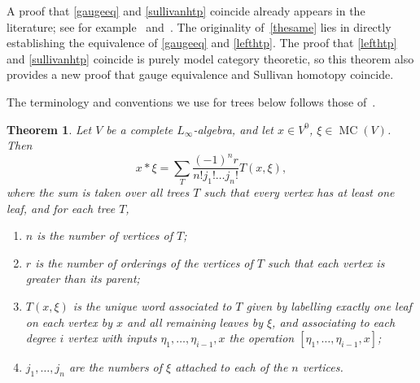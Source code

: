 \documentclass[a4paper,reqno]{amsart}
\theoremstyle{plain}
\newtheorem{thm}{Theorem}[section]
\theoremstyle{definition}
\theoremstyle{remark}
\DeclareMathOperator{\MC}{MC}
\begin{document}
A proof that \ref{gaugeeq} and \ref{sullivanhtp} coincide already appears in the literature; see for example~\cite{ss} and~\cite[Theorem 4.4]{cl10}.
The originality of~\cref{thesame} lies in directly establishing the equivalence of \ref{gaugeeq} and \ref{lefthtp}. 
The proof that \ref{lefthtp} and \ref{sullivanhtp} coincide is purely model category theoretic, so this theorem also provides a new proof that gauge equivalence and Sullivan homotopy coincide.

The terminology and conventions we use for trees below follows those of~\cite{gk94}.

\begin{thm}
  \label{result:gauge_formula}
  Let $V$ be a complete $L_{\infty}$-algebra, and let $x \in V^0$, $\xi \in \MC(V)$. Then
  \[
    x * \xi = \sum_T \frac{(-1)^n r}{n! j_1! \dots j_n!} T(x,\xi),
  \] 
  where the sum is taken over all trees $T$ such that every vertex has at least one leaf, and for each tree $T$, 
  \begin{enumerate}
    \item $n$ is the number of vertices of $T$;
    \item $r$ is the number of orderings of the vertices of $T$ such that each vertex is greater than its parent;
    \item $T(x,\xi)$ is the unique word associated to $T$ given by labelling exactly one leaf on each vertex by $x$ and all remaining leaves by $\xi$, and associating to each degree $i$ vertex with inputs $\eta_1, \dots, \eta_{i-1}, x$ the operation $[\eta_1, \dots, \eta_{i-1}, x]$;
    \item $j_1, \dots, j_n$ are the numbers of $\xi$ attached to each of the $n$ vertices.
  \end{enumerate}
\end{thm}
\end{document}
